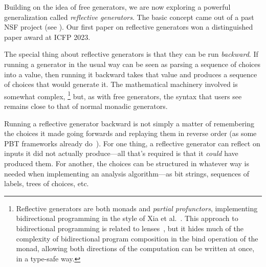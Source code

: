  Building on the
idea of free generators, we are now exploring a powerful
generalization called {\em reflective
  generators}.  The basic concept came out of a
past NSF project (see ). Our first paper on
reflective generators won a distinguished paper award at ICFP 2023.

The special thing about reflective generators is that they can be run
{\em backward}.
If running a generator in the usual way can be seen as parsing a
sequence of choices into a
value, then running it backward takes that value and produces a
sequence of choices that
would generate it.
The mathematical machinery
involved is somewhat complex,%
\footnote{\normalsize Reflective generators are both monads and {\em
    partial profunctors},
implementing bidirectional programming in the style of Xia et
al.~\cite{xia2019composing}. This approach to bidirectional programming is
related to lenses~\cite{foster2009bidirectional}, but it hides much of the
complexity of bidirectional program composition in the bind operation of the
monad, allowing both directions of
the computation can be written at once, in a type-safe way.}
but, as with free generators, the syntax that users see remains close to
that of normal monadic generators.

Running a reflective generator backward is not simply a matter of
remembering the choices it made going forwards and replaying them in
reverse order (as some PBT frameworks already do~\cite{maciver2019hypothesis,
  hatfield-dodds_hypofuzz_nodate}). For one thing, a reflective
generator can reflect on inputs it did not actually
produce---all that's required is that it {\em could} have produced
them.  For another, the choices can be structured in whatever way is needed
when implementing an analysis algorithm---as bit
strings, sequences of labels, trees of choices, etc.

